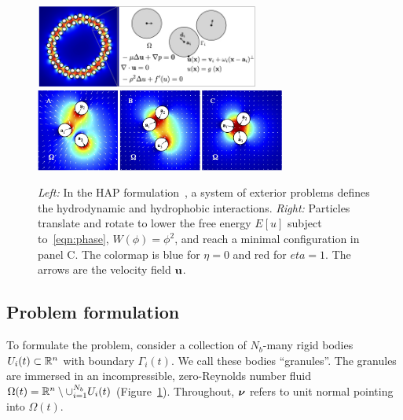 \begin{figure}
  \begin{center}
    \includegraphics[keepaspectratio,height=2.7cm]{figures/SpecificAim1/Domain.jpg}
    \includegraphics[keepaspectratio,height=2.7cm]{figures/SpecificAim1/3Particles.jpg}
  \end{center}
  \caption{\label{fig:flow_map} \footnotesize {\em Left:} In the HAP
  formulation~\cite{Fu2018_SIAM}, a system of exterior problems defines
  the hydrodynamic and hydrophobic interactions. {\em Right:} Particles
  translate and rotate to lower the free energy $E[u]$ subject
  to~\eqref{eqn:phase}, $W(\phi) = \phi^2$, and reach a minimal
  configuration in panel C. The colormap is blue for $\eta = 0$ and red
  for $eta = 1$. The arrows are the velocity field $\mathbf{u}$.}
\end{figure}

\subsection{Problem formulation}
To formulate the problem, consider a collection of $N_b$-many rigid
bodies $U_i(t) \subset \mathbb{R}^n$ with boundary $\Gamma_i(t)$. We call these
bodies ``granules''. The granules are immersed in an incompressible,
zero-Reynolds number fluid $\Omega(t) = \mathbb{R}^n \setminus \cup_{i=1}^{N_b}
U_i(t)$ (Figure~\ref{fig:flow_map}). Throughout, $\boldsymbol{\nu}$ refers to unit
normal pointing into $\Omega(t)$.

